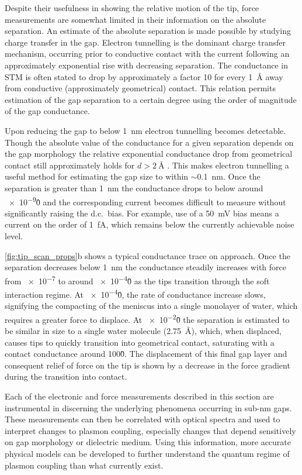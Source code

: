 \documentclass[a4paper]{article}
\begin{document}
Despite their usefulness in showing the relative motion of the tip, force measurements are somewhat limited in their information on the absolute separation. An estimate of the absolute separation is made possible by studying charge transfer in the gap. Electron tunnelling is the dominant charge transfer mechanism, occurring prior to conductive contact with the current following an approximately exponential rise with decreasing separation. The conductance in STM is often stated to drop by approximately a factor 10 for every \SI{1}{\angstrom} away from conductive (approximately geometrical) contact. This relation permits estimation of the gap separation to a certain degree using the order of magnitude of the gap conductance.

Upon reducing the gap to below \SI{1}{nm} electron tunnelling becomes detectable. Though the absolute value of the conductance for a given separation depends on the gap morphology the relative exponential conductance drop from geometrical contact still approximately holds for $d>\SI{2}{\angstrom}$ \cite{esteban2015}. This makes electron tunnelling a useful method for estimating the gap size to within $\sim$\SI{0.1}{nm}. Once the separation is greater than \SI{1}{nm} the conductance drops to below around \num{e-9}\G0 and the corresponding current becomes difficult to measure without significantly raising the d.c.\ bias. For example, use of a \SI{50}{mV} bias means a current on the order of \SI{1}{fA}, which remains below the currently achievable noise level.

\autoref{fig:tip_scan_props}b shows a typical conductance trace on approach. Once the separation decreases below \SI{1}{nm} the conductance steadily increases with force from \num{e-7} to around \num{e-4}\G0 as the tips transition through the soft interaction regime. At \num{e-4}\G0, the rate of conductance increase slows, signifying the compacting of the meniscus into a single monolayer of water, which requires a greater force to displace. At \num{e-2}\G0 the separation is estimated to be similar in size to a single water molecule (\SI{2.75}{\angstrom}), which, when displaced, causes tips to quickly transition into geometrical contact, saturating with a contact conductance around 100\G0. The displacement of this final gap layer and consequent relief of force on the tip is shown by a decrease in the force gradient during the transition into contact.

Each of the electronic and force measurements described in this section are instrumental in discerning the underlying phenomena occurring in sub-nm gaps. These measurements can then be correlated with optical spectra and used to interpret changes to plasmon coupling, especially changes that depend sensitively on gap morphology or dielectric medium. Using this information, more accurate physical models can be developed to further understand the quantum regime of plasmon coupling than what currently exist.
\end{document}
